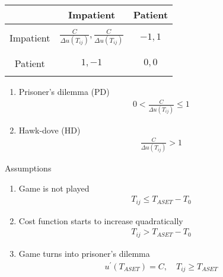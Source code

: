 \vspace{1.0cm}

\begin{tabularx}{1.0\linewidth}{ c | C | C }
& Impatient & Patient \\
\hline
&& \\
Impatient & $ \frac{C}{\Delta u(T_{ij})}, \frac{C}{\Delta u(T_{ij})} $ & $ -1, 1 $ \\
&& \\
\hline
&& \\
Patient & $ 1, -1 $ & $ 0, 0 $ \\
&& \\
\end{tabularx}

\vspace{1.0cm}

\begin{enumerate}[label=\roman{enumi})]
\item Prisoner's dilemma (PD)
\begin{align}
0 < \frac{C}{\Delta u(T_{ij})} \leq 1
\end{align}

\item Hawk-dove (HD)
\begin{align}
\frac{C}{\Delta u(T_{ij})} > 1
\end{align}

\end{enumerate}

Assumptions
\begin{enumerate}
\item Game is not played
\begin{align}
T_{ij} \leq T_{ASET} - T_{0}
\end{align}

\item Cost function starts to increase quadratically
\begin{align}
T_{ij} > T_{ASET} - T_{0}
\end{align}

\item Game turns into prisoner's dilemma
\begin{align}
u^{\prime}(T_{ASET}) = C, \quad T_{ij} \geq T_{ASET}
\end{align}

\end{enumerate}

